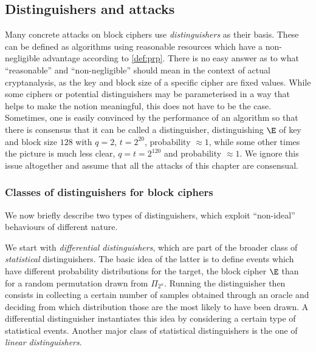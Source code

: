 \subsection{Distinguishers and attacks}
Many concrete attacks on block ciphers use \emph{distinguishers} as their basis. These can be defined as algorithms
using reasonable resources which have a non-negligible advantage according to \autoref{def:prp}.
There is no easy answer as to what ``reasonable'' and ``non-negligible'' should mean in the context of actual cryptanalysis,
as the key and block size of a specific cipher are fixed values. While some ciphers or potential distinguishers
may be parameterised in a way that helps to make the notion meaningful, this does not have to be the case. Sometimes, one is easily convinced by the performance of an algorithm so that there is
consensus that it can be called a distinguisher, \eg distinguishing $\E$ of key and block size $128$ with $q = 2$, $t = 2^{20}$, probability $\approx 1$, while some other times the picture is much less clear,
\eg $q = t =  2^{120}$ and probability $\approx 1$. We ignore this issue altogether and assume that all the attacks of this chapter are consensual.

\subsubsection{Classes of distinguishers for block ciphers}

We now briefly describe two types of distinguishers, which exploit ``non-ideal'' behaviours of different nature.

\bigskip

We start with \emph{differential distinguishers}, which are part of the broader class of \emph{statistical} distinguishers.
The basic idea of the latter is to define events which have different probability distributions for the target, \ie the block cipher $\E$
than for a random permutation drawn from $\Pi_{2^n}$. Running the distinguisher then consists in collecting a certain number of samples obtained through
an oracle and deciding from which distribution
those are the
most likely to have been drawn.
A differential distinguisher instantiates this idea by considering a certain type of statistical events. Another major class of
statistical distinguishers is the one of \emph{linear distinguishers}.

